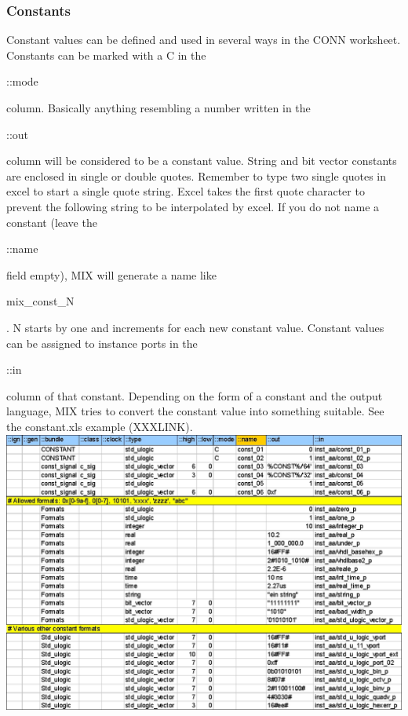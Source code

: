 \documentclass[a4paper,12pt]{article}
\begin{document}
\subsubsection{Constants}
Constant values can be defined and used in several ways in the CONN worksheet. Constants can be marked with a C in the \begin{tt}::mode\end{tt} column. Basically anything resembling a number written in the \begin{tt}::out\end{tt} column will be considered to be a constant value. String and bit vector constants are enclosed in single or double quotes. Remember to type two single quotes in excel to start a single quote string. Excel takes the first quote character to prevent the following string to be interpolated by excel.\newline
If you do not name a constant (leave the \begin{tt}::name\end{tt} field empty), MIX will generate a name like \begin{tt}mix\_const\_N\end{tt}. N starts by one and increments for each new constant value.\newline
Constant values can be assigned to instance ports in the \begin{tt}::in\end{tt} column of that constant.
\newline Depending on the form of a constant and the output language, MIX tries to convert the constant value into something suitable. See the constant.xls example (XXXLINK).\\
\includegraphics[scale=0.43]{images/mix_table1.jpg}\\
\end{document}
